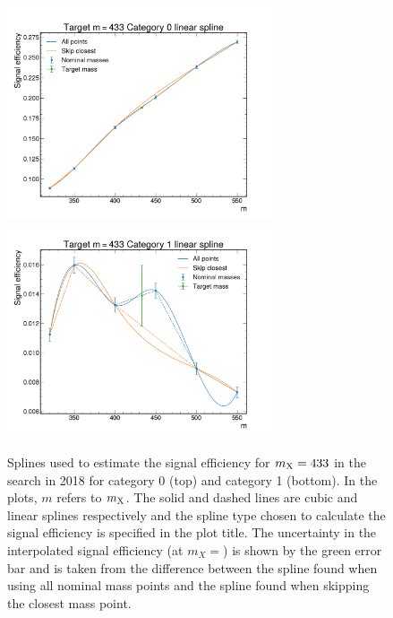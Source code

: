 \begin{figure}
  \centering
  \includegraphics[width=0.7\textwidth]{Figures/Dihiggs/signal/sigeff_interpolation/graviton_433_2018_cat0_interpolation.pdf} \\
  \includegraphics[width=0.7\textwidth]{Figures/Dihiggs/signal/sigeff_interpolation/graviton_433_2018_cat1_interpolation.pdf}
  \caption[Signal Efficiency Splines for $\mX=433$\GeV in the \XTwoHH Search]{Splines used to estimate the signal efficiency for $\mX=433$ in the \XTwoHH search in 2018 for category 0 (top) and category 1 (bottom). In the plots, $m$ refers to $m_{\mathrm{X}}$. The solid and dashed lines are cubic and linear splines respectively and the spline type chosen to calculate the signal efficiency is specified in the plot title. The uncertainty in the interpolated signal efficiency (at $m_X=$) is shown by the green error bar and is taken from the difference between the spline found when using all nominal mass points and the spline found when skipping the closest mass point.}\label{fig:graviton_example_splines2}
\end{figure}

